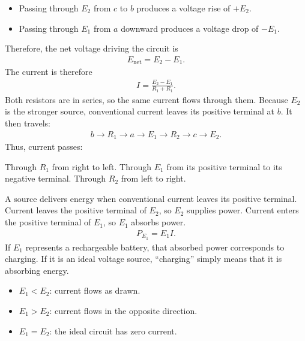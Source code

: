 \documentclass{report}
\begin{document}
\begin{itemize}
\begin{itemize}
                \item Passing through \(E_2\) from \(c\) to \(b\) produces a voltage rise of \(+E_2\).
                \item Passing through \(E_1\) from \(a\) downward produces a voltage drop of \(-E_1\).
            \end{itemize}
            Therefore, the net voltage driving the circuit is
            \begin{align*}
                E_{\text{net}} = E_{2} - E_{1}
            .\end{align*}
            The current is therefore
            \begin{align*}
                I = \frac{E_{2} - E_{1}}{R_{1} + R_{1}}
            .\end{align*}
            Both resistors are in series, so the same current flows through them.
            \bigbreak \noindent 
            Because \(E_2\) is the stronger source, conventional current leaves its positive terminal at \(b\). It then travels:
            \begin{align*}
               b \to R_{1} \to a \to E_{1} \to R_{2} \to c \to E_{2} 
            .\end{align*}
            Thus, current passes:
            \begin{itemize}
                Through \(R_1\) from right to left.
                Through \(E_1\) from its positive terminal to its negative terminal.
                Through \(R_2\) from left to right.
            \end{itemize}
            A source delivers energy when conventional current leaves its positive terminal. Current leaves the positive terminal of \(E_2\), so \(E_2\) supplies power.
            \bigbreak \noindent 
            Current enters the positive terminal of $E_{1}$, so $E_{1}$ absorbs power.
            \begin{align*}
                P_{E_{1}} = E_{1}I
            .\end{align*}
            If \(E_1\) represents a rechargeable battery, that absorbed power corresponds to charging. If it is an ideal voltage source, “charging” simply means that it is absorbing energy.
            \begin{itemize}
                \item \(E_{1} < E_{2}\): current flows as drawn.
                \item \(E_1>E_2\): current flows in the opposite direction.
                \item \(E_1=E_2\): the ideal circuit has zero current.

\end{itemize}
\end{itemize}
\end{document}
